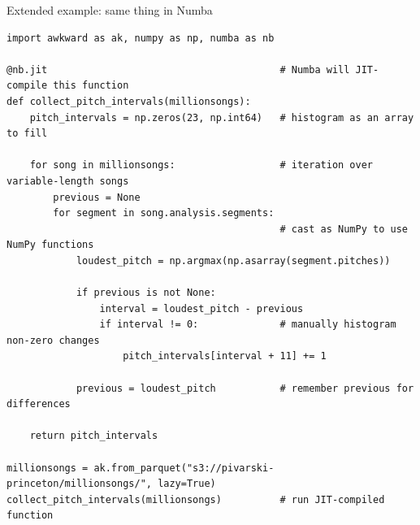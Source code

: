 \documentclass[aspectratio=169]{beamer}
\begin{document}
\begin{frame}[fragile]{Extended example: same thing in Numba}
\vspace{0.2 cm}
\scriptsize
\begin{verbatim}
import awkward as ak, numpy as np, numba as nb

@nb.jit                                        # Numba will JIT-compile this function
def collect_pitch_intervals(millionsongs):
    pitch_intervals = np.zeros(23, np.int64)   # histogram as an array to fill

    for song in millionsongs:                  # iteration over variable-length songs
        previous = None
        for segment in song.analysis.segments:
                                               # cast as NumPy to use NumPy functions
            loudest_pitch = np.argmax(np.asarray(segment.pitches))

            if previous is not None:
                interval = loudest_pitch - previous
                if interval != 0:              # manually histogram non-zero changes
                    pitch_intervals[interval + 11] += 1

            previous = loudest_pitch           # remember previous for differences

    return pitch_intervals

millionsongs = ak.from_parquet("s3://pivarski-princeton/millionsongs/", lazy=True)
collect_pitch_intervals(millionsongs)          # run JIT-compiled function
\end{verbatim}
\end{frame}
\end{document}
